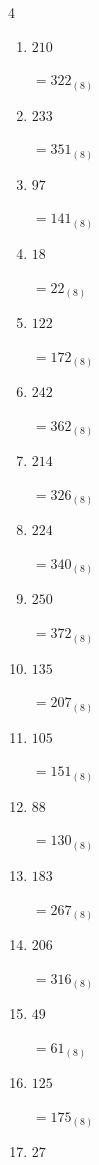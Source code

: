 \begin{multicols}{4}
\begin{enumerate}
  \item $210$

        $=322_{(8)}$

  \item $233$

        $=351_{(8)}$

  \item $97$

        $=141_{(8)}$

  \item $18$

        $=22_{(8)}$

\columnbreak %

  \item $122$

        $=172_{(8)}$

  \item $242$

        $=362_{(8)}$

  \item $214$

        $=326_{(8)}$

  \item $224$

        $=340_{(8)}$

  \item $250$

        $=372_{(8)}$

  \item $135$

        $=207_{(8)}$

  \item $105$

        $=151_{(8)}$

  \item $88$

        $=130_{(8)}$

  \item $183$

        $=267_{(8)}$

  \item $206$

        $=316_{(8)}$

  \item $49$

        $=61_{(8)}$

  \item $125$

        $=175_{(8)}$

  \item $27$


\end{enumerate}
\end{multicols}
